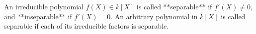 An irreducible polynomial $f(X) \in k[X]$ is called **separable** if $f'(X) \neq 0$, and **inseparable** if $f'(X) = 0$. An arbitrary polynomial in $k[X]$ is called separable if each of its irreducible factors is separable.
